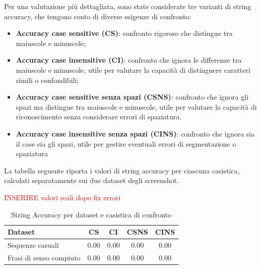 Per una valutazione più dettagliata, sono state considerate tre varianti di string accuracy, che tengono conto di diverse esigenze di confronto:

\begin{itemize}
    \item \textbf{Accuracy case sensitive (CS)}: confronto rigoroso che distingue tra maiuscole e minuscole;
    \item \textbf{Accuracy case insensitive (CI)}: confronto che ignora le differenze tra maiuscole e minuscole, utile per valutare la capacità di distinguere caratteri simili o confondibili;
    \item \textbf{Accuracy case sensitive senza spazi (CSNS)}: confronto che ignora gli spazi ma distingue tra maiuscole e minuscole, utile per valutare la capacità di riconoscimento senza considerare errori di spaziatura.
    \item \textbf{Accuracy case insensitive senza spazi (CINS)}: confronto che ignora sia il case sia gli spazi, utile per gestire eventuali errori di segmentazione o spaziatura

\end{itemize}

La tabella seguente riporta i valori di string accuracy per ciascuna casistica, calcolati separatamente sui due dataset degli screenshot.

\textcolor{red}{INSERIRE valori reali dopo fix errori}

\begin{table}[htbp]
    \centering
    \begin{tabular}{lcccc}
        \toprule
        Dataset                 & CS & CI & CSNS & CINS \\
        \midrule
        Sequenze casuali        & 0.00 & 0.00 & 0.00 & 0.00 \\
        Frasi di senso compiuto & 0.00 & 0.00 & 0.00 & 0.00 \\
        \bottomrule
    \end{tabular}
    \caption{String Accuracy per dataset e casistica di confronto}
    \label{tab:string_accuracy_stats}
\end{table}
